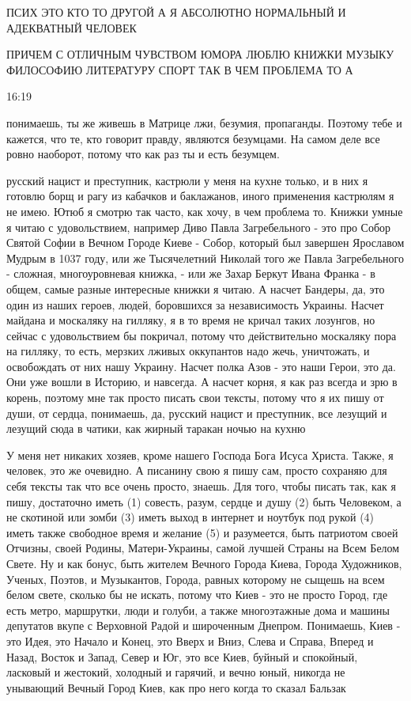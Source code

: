 ПСИХ ЭТО КТО ТО ДРУГОЙ А Я АБСОЛЮТНО НОРМАЛЬНЫЙ И АДЕКВАТНЫЙ ЧЕЛОВЕК

ПРИЧЕМ С ОТЛИЧНЫМ ЧУВСТВОМ ЮМОРА ЛЮБЛЮ КНИЖКИ МУЗЫКУ ФИЛОСОФИЮ ЛИТЕРАТУРУ СПОРТ
ТАК В ЧЕМ ПРОБЛЕМА ТО А

16:19

понимаешь, ты же живешь в Матрице лжи, безумия, пропаганды. Поэтому тебе и
кажется, что те, кто говорит правду, являются безумцами. На самом деле все
ровно наоборот, потому что как раз ты и есть безумцем.


русский нацист и преступник, кастрюли у меня на кухне только, и в них я готовлю
борщ и рагу из кабачков и баклажанов, иного применения кастрюлям я не имею.
Ютюб я смотрю так часто, как хочу, в чем проблема то. Книжки умные я читаю с
удовольствием, например Диво Павла Загребельного - это про Собор Святой Софии в
Вечном Городе Киеве - Собор, который был завершен Ярославом Мудрым в 1037 году,
или же Тысячелетний Николай того же Павла Загребельного - сложная,
многоуровневая книжка, - или же Захар Беркут Ивана Франка - в общем, самые
разные интересные книжки я читаю. А насчет Бандеры, да, это один из наших
героев, людей, боровшихся за независимость Украины. Насчет майдана и москаляку
на гилляку, я в то время не кричал таких лозунгов, но сейчас с удовольствием бы
покричал, потому что действительно москаляку пора на гилляку, то есть, мерзких
лживых оккупантов надо жечь, уничтожать, и освобождать от них нашу Украину.
Насчет полка Азов - это наши Герои, это да. Они уже вошли в Историю, и
навсегда. А насчет корня, я как раз всегда и зрю в корень, поэтому мне так
просто писать свои тексты, потому что я их пишу от души, от сердца, понимаешь,
да, русский нацист и преступник, все лезущий и лезущий сюда в чатики, как
жирный таракан ночью на кухню


У меня нет никаких хозяев, кроме нашего Господа Бога Исуса Христа.  Также, я
человек, это же очевидно. А писанину свою я пишу сам, просто сохраняю для себя
тексты так что все очень просто, знаешь. Для того, чтобы писать так, как я
пишу, достаточно иметь (1) совесть, разум, сердце и душу (2) быть Человеком, а
не скотиной или зомби (3) иметь выход в интернет и ноутбук под рукой (4) иметь
также свободное время и желание (5) и разумеется, быть патриотом своей Отчизны,
своей Родины, Матери-Украины, самой лучшей Страны на Всем Белом Свете. Ну и как
бонус, быть жителем Вечного Города Киева, Города Художников, Ученых, Поэтов, и
Музыкантов, Города, равных которому не сыщешь на всем белом свете, сколько бы
не искать, потому что Киев - это не просто Город, где есть метро, маршрутки,
люди и голуби, а также многоэтажные дома и машины депутатов вкупе с Верховной
Радой и широченным Днепром. Понимаешь, Киев - это Идея, это Начало и Конец, это
Вверх и Вниз, Слева и Справа, Вперед и Назад, Восток и Запад, Север и Юг, это
все Киев, буйный и спокойный, ласковый и жестокий, холодный и гарячий, и вечно
юный, никогда не унывающий Вечный Город Киев, как про него когда то сказал
Бальзак

